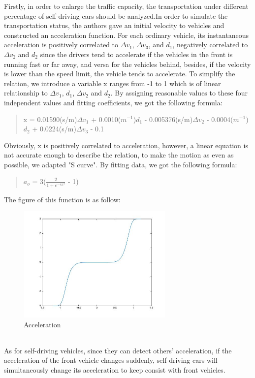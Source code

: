 \documentclass{icmmcm}
\begin{document}
Firstly, in order to enlarge the traffic capacity, the transportation under different percentage of self-driving cars should be analyzed.In order to simulate the transportation status, the authors gave an initial velocity to vehicles and constructed an  acceleration function. For each ordinary vehicle, its instantaneous acceleration is positively correlated to $\Delta$$v_{1}$, $\Delta$$v_{3}$, and $d_{1}$, negatively correlated to $\Delta$$v_{2}$ and $d_{2}$ since the drivers tend to accelerate if the vehicles in the front is running fast or far away, and versa for the vehicles behind, besides, if the velocity is lower than the speed limit, the vehicle tends to accelerate. To simplify the relation, we introduce a variable x ranges from -1 to 1 which is of linear relationship to  $\Delta$$v_{1}$,  $d_{1}$, $\Delta$$v_{2}$ and $d_{2}$. By assigning reasonable values to these four independent values and fitting coefficients, we got the following formula:
\begin{quotation}
 x = 0.01590(s/m)$\Delta$$v_{1}$ + 0.0010($m^{-1}$)$d_{1}$ - 0.005376(s/m)$\Delta$$v_{2}$ - 0.0004($m^{-1}$)$d_{2}$ + 0.0224(s/m)$\Delta$$v_{3}$ - 0.1
\end{quotation}
Obviously, x is positively correlated to acceleration, however, a linear equation is not accurate enough to describe the relation, to make the motion as even as possible, we adapted "S curve". By fitting data, we got the following formula:\\
\begin{quotation}
$a_{o}$ = 3($\frac{2}{1 + e^{-4x^{3}}}$ - 1) %
\end{quotation}
The figure of this function is as follow:\\
\begin{figure}[!htp]
\centering
\includegraphics[height=5.7cm]{Acceleration.jpg}
\caption{Acceleration}
\end{figure}
\\
As for self-driving vehicles, since they can detect others' acceleration, if the acceleration of the front vehicle changes suddenly, self-driving cars will simultaneously change its acceleration to keep consist with front vehicles.\\
\end{document}

